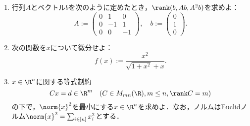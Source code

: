 \documentclass[uplatex,dvipdfmx]{jsarticle}
\begin{document}
\begin{tcolorbox}[colframe=ForestGreen, colback=ForestGreen!10!white,breakable,colbacktitle=ForestGreen!40!white,coltitle=black,fonttitle=\bfseries\sffamily,
    title=第１問]
    \begin{problem}\mbox{}\label{prob-21-1-1-Generalized-Inverse}
        \begin{enumerate}
            \item 行列$A$とベクトル$b$を次のように定めたとき，$\rank(b,Ab,A^2b)$を求めよ：
            \[A:=\begin{pmatrix}0&1&0\\0&-1&1\\0&0&-1\end{pmatrix},\quad b:=\begin{pmatrix}0\\1\\0\end{pmatrix}.\]
            \item 次の関数を$x$について微分せよ：
            \[f(x):=\frac{x^2}{\sqrt{1+x^2}+x}.\]
            \item $x\in\R^n$に関する等式制約\[Cx=d\in\R^m\quad(C\in M_{mn}(\R),m\le n,\rank C=m)\]の下で，$\norm{x}^2$を最小にする$x\in\R^n$を求めよ．なお，ノルムはEuclidノルム$\norm{x}^2=\sum_{i\in[n]}x_i^2$とする．
        \end{enumerate}
    \end{problem}
\end{tcolorbox}
\end{document}
